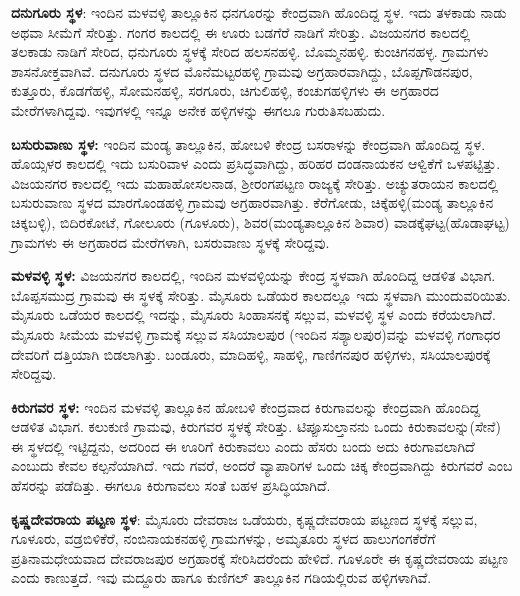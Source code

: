 \textbf{ದನುಗೂರು ಸ್ಥಳ}: ಇಂದಿನ ಮಳವಳ್ಳಿ ತಾಲ್ಲೂಕಿನ ಧನಗೂರನ್ನು ಕೇಂದ್ರವಾಗಿ ಹೊಂದಿದ್ದ ಸ್ಥಳ. ಇದು ತಳಕಾಡು ನಾಡು ಅಥವಾ ಸೀಮೆಗೆ ಸೇರಿತ್ತು. ಗಂಗರ ಕಾಲದಲ್ಲಿ ಈ ಊರು ಬಡಗೆರೆ ನಾಡಿಗೆ ಸೇರಿತ್ತು. ವಿಜಯನಗರ ಕಾಲದಲ್ಲಿ ತಲಕಾಡು ನಾಡಿಗೆ ಸೇರಿದ, ಧನುಗೂರು ಸ್ಥಳಕ್ಕೆ ಸೇರಿದ ಹಲಸನಹಳ್ಳಿ. ಬೊಮ್ಮನಹಳ್ಳಿ. ಕುಂಚಿಗನಹಳ್ಳ. ಗ್ರಾಮಗಳು ಶಾಸನೋಕ್ತವಾಗಿವೆ. ದನುಗೂರು ಸ್ಥಳದ ಮೊನೆಮಟ್ಟರಹಳ್ಳಿ ಗ್ರಾಮವು ಅಗ್ರಹಾರವಾಗಿದ್ದು, ಬೊಪ್ಪಗೌಡನಪುರ, ಕುತ್ತೂರು, ಕೊಡಗೆಹಳ್ಳಿ, ಸೋಮನಹಳ್ಳಿ, ಸರಗೂರು, ಚಿಗುಲಿಹಳ್ಳಿ, ಕಂಚುಗಹಳ್ಳಿಗಳು ಈ ಅಗ್ರಹಾರದ ಮೇರೆಗಳಾಗಿದ್ದವು. ಇವುಗಳಲ್ಲಿ ಇನ್ನೂ ಅನೇಕ ಹಳ್ಳಿಗಳನ್ನು ಈಗಲೂ ಗುರುತಿಸಬಹುದು.

\textbf{ಬಸುರುವಾಣು ಸ್ಥಳ:} ಇಂದಿನ ಮಂಡ್ಯ ತಾಲ್ಲೂಕಿನ, ಹೋಬಳಿ ಕೇಂದ್ರ ಬಸರಾಳನ್ನು ಕೇಂದ್ರವಾಗಿ ಹೊಂದಿದ್ದ ಸ್ಥಳ. ಹೊಯ್ಸಳರ ಕಾಲದಲ್ಲಿ ಇದು ಬಸುರಿವಾಳ ಎಂದು ಪ್ರಸಿದ್ಧವಾಗಿದ್ದು, ಹರಿಹರ ದಂಡನಾಯಕನ ಆಳ್ವಿಕೆಗೆ ಒಳಪಟ್ಟಿತ್ತು. ವಿಜಯನಗರ ಕಾಲದಲ್ಲಿ ಇದು ಮಹಾಹೋಸಲನಾಡ, ಶ‍್ರೀರಂಗಪಟ್ಟಣ ರಾಜ್ಯಕ್ಕೆ ಸೇರಿತ್ತು. ಅಚ್ಯುತರಾಯನ ಕಾಲದಲ್ಲಿ ಬಸುರುವಾಣು ಸ್ಥಳದ ಮಾರಗೊಂಡಹಳ್ಳಿ ಗ್ರಾಮವು ಅಗ್ರಹಾರವಾಗಿತ್ತು. ಕೆರೆಗೋಡು, ಚಿಕ್ಕೆಹಳ್ಳಿ(ಮಂಡ್ಯ ತಾಲ್ಲೂಕಿನ ಚಿಕ್ಕಬಳ್ಳಿ), ಬಿದಿರಕೋಟೆ, ಗೋಲೂರು (ಗೂಳೂರು), ಶಿವರ(ಮಂಡ್ಯತಾಲ್ಲೂಕಿನ ಶಿವಾರ) ವಾಡಕ್ಕೆಘಟ್ಟ(ಹೊಡಾಘಟ್ಟ) ಗ್ರಾಮಗಳು ಈ ಅಗ್ರಹಾರದ ಮೇರೆಗಳಾಗಿ, ಬಸರುವಾಣು ಸ್ಥಳಕ್ಕೆ ಸೇರಿದ್ದವು.

\textbf{ಮಳವಳ್ಳಿ ಸ್ಥಳ:} ವಿಜಯನಗರ ಕಾಲದಲ್ಲಿ, ಇಂದಿನ ಮಳವಳ್ಳಿಯನ್ನು ಕೇಂದ್ರ ಸ್ಥಳವಾಗಿ ಹೊಂದಿದ್ದ ಆಡಳಿತ ವಿಭಾಗ. ಬೊಪ್ಪಸಮುದ್ರ ಗ್ರಾಮವು ಈ ಸ್ಥಳಕ್ಕೆ ಸೇರಿತ್ತು. ಮೈಸೂರು ಒಡೆಯರ ಕಾಲದಲ್ಲೂ ಇದು ಸ್ಥಳವಾಗಿ ಮುಂದುವರಿಯಿತು. ಮೈಸೂರು ಒಡೆಯರ ಕಾಲದಲ್ಲಿ ಇದನ್ನು, ಮೈಸೂರು ಸಿಂಹಾಸನಕ್ಕೆ ಸಲ್ಲುವ, ಮಳವಳ್ಳಿ ಸ್ಥಳ ಎಂದು ಕರೆಯಲಾಗಿದೆ. ಮೈಸೂರು ಸೀಮೆಯ ಮಳವಳ್ಳಿ ಗ್ರಾಮಕ್ಕೆ ಸಲ್ಲುವ ಸಸಿಯಾಲಪುರ (ಇಂದಿನ ಸಶ್ಯಾಲಪುರ)ವನ್ನು ಮಳವಳ್ಳಿ ಗಂಗಾಧರ ದೇವರಿಗೆ ದತ್ತಿಯಾಗಿ ಬಿಡಲಾಗಿತ್ತು. ಬಂಡೂರು, ಮಾದಿಹಳ್ಳಿ, ಸಾಹಳ್ಳಿ, ಗಾಣಿಗನಪುರ ಹಳ್ಳಿಗಳು, ಸಸಿಯಾಲಪುರಕ್ಕೆ ಸೇರಿದ್ದವು.

\textbf{ಕಿರುಗವರ ಸ್ಥಳ:} ಇಂದಿನ ಮಳವಳ್ಳಿ ತಾಲ್ಲೂಕಿನ ಹೋಬಳಿ ಕೇಂದ್ರವಾದ ಕಿರುಗಾವಲನ್ನು ಕೇಂದ್ರವಾಗಿ ಹೊಂದಿದ್ದ ಆಡಳಿತ ವಿಭಾಗ. ಕಲುಕುಣಿ ಗ್ರಾಮವು, ಕಿರುಗವರ ಸ್ಥಳಕ್ಕೆ ಸೇರಿತ್ತು. ಟಿಪ್ಪೂಸುಲ್ತಾನನು ಒಂದು ಕಿರುಕಾವಲನ್ನು(ಸೇನೆ) ಈ ಸ್ಥಳದಲ್ಲಿ ಇಟ್ಟಿದ್ದನು, ಅದರಿಂದ ಈ ಊರಿಗೆ ಕಿರುಕಾವಲು ಎಂದು ಹೆಸರು ಬಂದು ಅದು ಕಿರುಗಾವಲಾಗಿದೆ ಎಂಬುದು ಕೇವಲ ಕಲ್ಪನೆಯಾಗಿದೆ. ಇದು ಗವರೆ, ಅಂದರೆ ವ್ಯಾಪಾರಿಗಳ ಒಂದು ಚಿಕ್ಕ ಕೇಂದ್ರವಾಗಿದ್ದು ಕಿರುಗವರೆ ಎಂಬ ಹೆಸರನ್ನು ಪಡೆದಿತ್ತು. ಈಗಲೂ ಕಿರುಗಾವಲು ಸಂತೆ ಬಹಳ ಪ್ರಸಿದ್ಧಿಯಾಗಿದೆ.

\textbf{ಕೃಷ್ಣದೇವರಾಯ ಪಟ್ಟಣ ಸ್ಥಳ}: ಮೈಸೂರು ದೇವರಾಜ ಒಡೆಯರು, ಕೃಷ್ಣದೇವರಾಯ ಪಟ್ಟಣದ ಸ್ಥಳಕ್ಕೆ ಸಲ್ಲುವ, ಗೂಳೂರು, ವಡ್ರಬಿಳಿಕೆರೆ, ನಂಬಿನಾಯಕನಹಳ್ಳಿ ಗ್ರಾಮಗಳನ್ನು, ಅಮೃತೂರು ಸ್ಥಳದ ಹಾಲುಗಂಗಕೆರೆಗೆ ಪ್ರತಿನಾಮಧೇಯವಾದ ದೇವರಾಜಪುರ ಅಗ್ರಹಾರಕ್ಕೆ ಸೇರಿಸಿದರೆಂದು ಹೇಳಿದೆ. ಗೂಳೂರೇ ಈ ಕೃಷ್ಣದೇವರಾಯ ಪಟ್ಟಣ ಎಂದು ಕಾಣುತ್ತದೆ. ಇವು ಮದ್ದೂರು ಹಾಗೂ ಕುಣಿಗಲ್​ ತಾಲ್ಲೂಕಿನ ಗಡಿಯಲ್ಲಿರುವ ಹಳ್ಳಿಗಳಾಗಿವೆ.

